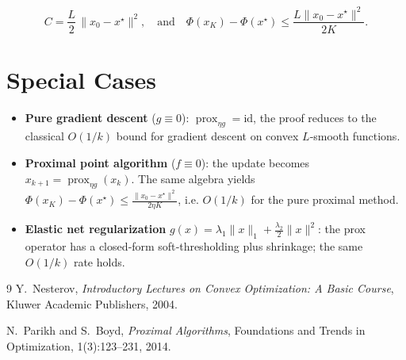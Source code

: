 \documentclass{article}
\newcommand{\prox}{\operatorname{prox}}
\begin{document}
\[
C=\frac{L}{2}\,\|x_{0}-x^{\star}\|^{2},
\quad\text{and}\quad
\Phi(x_{K})-\Phi(x^{\star})\le \frac{L\|x_{0}-x^{\star}\|^{2}}{2K}.
\]

\section*{Special Cases}
\begin{itemize}
\item \textbf{Pure gradient descent} ($g\equiv0$): $\prox_{\eta g}=\mathrm{id}$, the proof reduces to the classical $O(1/k)$ bound for gradient descent on convex $L$‑smooth functions.
\item \textbf{Proximal point algorithm} ($f\equiv0$): the update becomes $x_{k+1}= \prox_{\eta g}(x_{k})$. The same algebra yields $\Phi(x_{K})- \Phi(x^{\star})\le \frac{\|x_{0}-x^{\star}\|^{2}}{2\eta K}$, i.e. $O(1/k)$ for the pure proximal method.
\item \textbf{Elastic net regularization} $g(x)=\lambda_{1}\|x\|_{1}+\frac{\lambda_{2}}{2}\|x\|^{2}$: the prox operator has a closed‑form soft‑thresholding plus shrinkage; the same $O(1/k)$ rate holds.
\end{itemize}

\begin{thebibliography}{9}
Y.~Nesterov,
\emph{Introductory Lectures on Convex Optimization: A Basic Course},
Kluwer Academic Publishers, 2004.

N.~Parikh and S.~Boyd,
\emph{Proximal Algorithms},
Foundations and Trends in Optimization, 1(3):123–231, 2014.
\end{thebibliography}
\end{document}
